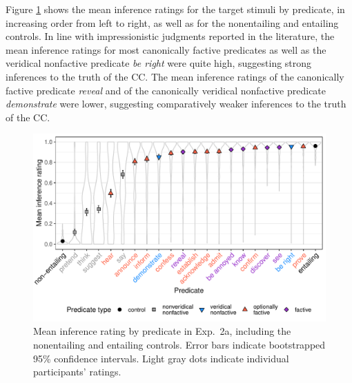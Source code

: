 \documentclass{language}
\newcommand{\6}{\mbox{$[\hspace*{-.6mm}[$}}
\newcommand{\9}{\mbox{$]\hspace*{-.6mm}]$}}
\begin{document}
Figure \ref{f-veridicality-predicate} shows the mean inference ratings for the target stimuli by predicate, in increasing order from left to right, as well as for the nonentailing and entailing controls. In line with impressionistic judgments reported in the literature, the mean inference ratings for most canonically factive predicates as well as the veridical nonfactive predicate {\em be right} were quite high, suggesting strong inferences to the truth of the CC. The mean inference ratings of the canonically factive predicate {\em reveal} and of the canonically veridical nonfactive predicate {\em demonstrate} were lower, suggesting comparatively weaker inferences to the truth of the CC. 


\begin{figure}[h!]
\centering

\includegraphics[width=.7\paperwidth]{Language-figures/color/Figure9}

\caption{Mean inference rating by predicate in Exp.~2a, including the nonentailing and entailing controls. Error bars indicate bootstrapped 95\% confidence intervals. Light gray dots indicate individual participants' ratings.} 
\label{f-veridicality-predicate}
\end{figure}
\end{document}
